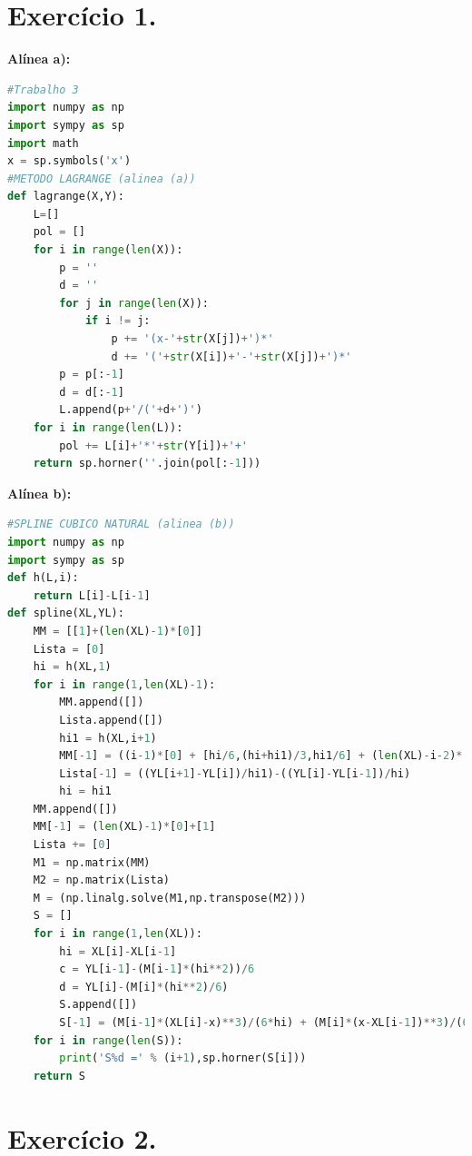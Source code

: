 \documentclass{article}
\begin{document}
\section*{Exercício 1.}
\textbf{Alínea a):}
\begin{lstlisting}[language=Python]
#Trabalho 3
import numpy as np
import sympy as sp
import math
x = sp.symbols('x')
#METODO LAGRANGE (alinea (a))
def lagrange(X,Y):
    L=[]
    pol = []
    for i in range(len(X)):
        p = ''
        d = ''
        for j in range(len(X)):
            if i != j:
                p += '(x-'+str(X[j])+')*'
                d += '('+str(X[i])+'-'+str(X[j])+')*'
        p = p[:-1]
        d = d[:-1]
        L.append(p+'/('+d+')')
    for i in range(len(L)):
        pol += L[i]+'*'+str(Y[i])+'+'
    return sp.horner(''.join(pol[:-1]))
\end{lstlisting}
\textbf{Alínea b):}
\begin{lstlisting}[language=Python]
#SPLINE CUBICO NATURAL (alinea (b))
import numpy as np
import sympy as sp
def h(L,i):
    return L[i]-L[i-1]
def spline(XL,YL):
    MM = [[1]+(len(XL)-1)*[0]]
    Lista = [0]
    hi = h(XL,1)
    for i in range(1,len(XL)-1):
        MM.append([])
        Lista.append([])
        hi1 = h(XL,i+1)
        MM[-1] = ((i-1)*[0] + [hi/6,(hi+hi1)/3,hi1/6] + (len(XL)-i-2)*[0])
        Lista[-1] = ((YL[i+1]-YL[i])/hi1)-((YL[i]-YL[i-1])/hi)
        hi = hi1
    MM.append([])
    MM[-1] = (len(XL)-1)*[0]+[1]
    Lista += [0]
    M1 = np.matrix(MM)
    M2 = np.matrix(Lista)
    M = (np.linalg.solve(M1,np.transpose(M2)))
    S = []
    for i in range(1,len(XL)):
        hi = XL[i]-XL[i-1]
        c = YL[i-1]-(M[i-1]*(hi**2))/6
        d = YL[i]-(M[i]*(hi**2)/6)
        S.append([])
        S[-1] = (M[i-1]*(XL[i]-x)**3)/(6*hi) + (M[i]*(x-XL[i-1])**3)/(6*hi) + c*(XL[i]-x)/hi + (d*(x-XL[i-1]))/hi
    for i in range(len(S)):
        print('S%d =' % (i+1),sp.horner(S[i]))
    return S

\end{lstlisting}
\section*{Exercício 2.}
\end{document}
